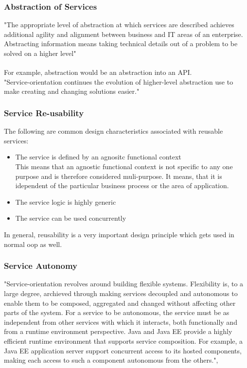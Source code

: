\documentclass[12pt]{article}
\begin{document}
\subsubsection{Abstraction of Services}
"The appropriate level of abstraction at which services are described achieves additional agility and alignment between business and IT areas of an enterprise. Abstracting information means taking technical details out of a problem to be solved on a higher level"\cite[page 184]{grau}\\
\\
For example, abstraction would be an abstraction into an API.\\
"Service-orientation continues the evolution of higher-level abstraction use to make creating and changing solutions easier."\cite[page 184]{grau}\\
\subsubsection{Service Re-usability}
The following are common design characteristics associated with reusable services:
\begin{itemize}
\item The service is defined by an agnositc functional context \\
	This means that an agnostic functional context is not specific to any one purpose and is therefore considered muli-purpose. It means, that it is idependent of the particular business process or the area of application.
\item The service logic is highly generic %
\item The service can be used concurrently
\end{itemize}
In general, reusability is a very important design principle %
which gets used in normal \gls{oop} as well. \cite[page 140-150]{grau}
\subsubsection{Service Autonomy}
"Service-orientation revolves around building flexible systems. Flexibility is, to a large degree, archieved through making services decoupled and autonomous to enable them to be composed, aggregated and changed without affecting other parts of the system. For a service to be autonomous, the service must be as independent from other services with which it interacts, both functionally and from a runtime environment perspective. Java and Java EE provide a highly efficient runtime environment that supports service composition. For example, a Java EE application server support concurrent access to its hosted components, making each access to such a component autonomous from the others.", \cite[page 194]{grau}\\
\end{document}
